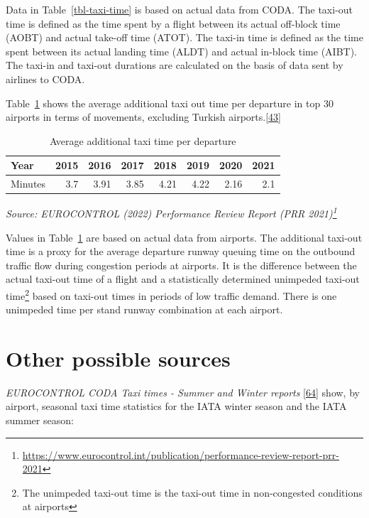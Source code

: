 \documentclass[
  11pt,
  a4paper,
]{book}
\DeclareRobustCommand{\href}[2]{#2\footnote{\url{#1}}}
\begin{document}
Data in Table~\ref{tbl-taxi-time} is based on actual data from CODA. The
taxi-out time is defined as the time spent by a flight between its
actual off-block time (AOBT) and actual take-off time (ATOT). The
taxi-in time is defined as the time spent between its actual landing
time (ALDT) and actual in-block time (AIBT). The taxi-in and taxi-out
durations are calculated on the basis of data sent by airlines to CODA.

Table~\ref{tbl-taxi-time-additional} shows the average additional taxi
out time per departure in top 30 airports in terms of movements,
excluding Turkish
airports.\protect\hyperlink{ref-ectrlprr2022}{{[}43{]}}

\hypertarget{tbl-taxi-time-additional}{}
\setlength{\LTpost}{0mm}
\begin{longtable}{lrrrrrrr}
\caption{\label{tbl-taxi-time-additional}Average additional taxi time per departure }\tabularnewline

\toprule
Year & 2015 & 2016 & 2017 & 2018 & 2019 & 2020 & 2021 \\ 
\midrule
Minutes & 3.7 & 3.91 & 3.85 & 4.21 & 4.22 & 2.16 & 2.1 \\ 
\bottomrule
\end{longtable}
\begin{minipage}{\linewidth}
\emph{Source: \href{https://www.eurocontrol.int/publication/performance-review-report-prr-2021}{EUROCONTROL (2022) Performance Review Report (PRR 2021)}}\\
\end{minipage}

Values in Table~\ref{tbl-taxi-time-additional} are based on actual data
from airports. The additional taxi-out time is a proxy for the average
departure runway queuing time on the outbound traffic flow during
congestion periods at airports. It is the difference between the actual
taxi-out time of a flight and a statistically determined unimpeded
taxi-out time\footnote{The unimpeded taxi-out time is the taxi-out time
  in non-congested conditions at airports} based on taxi-out times in
periods of low traffic demand. There is one unimpeded time per stand
runway combination at each airport.

\hypertarget{other-possible-sources-6}{%
\section{Other possible sources}\label{other-possible-sources-6}}

\emph{EUROCONTROL CODA Taxi times - Summer and Winter reports}
\protect\hyperlink{ref-taxi:time}{{[}64{]}} show, by airport, seasonal
taxi time statistics for the IATA winter season and the IATA summer
season:
\end{document}
